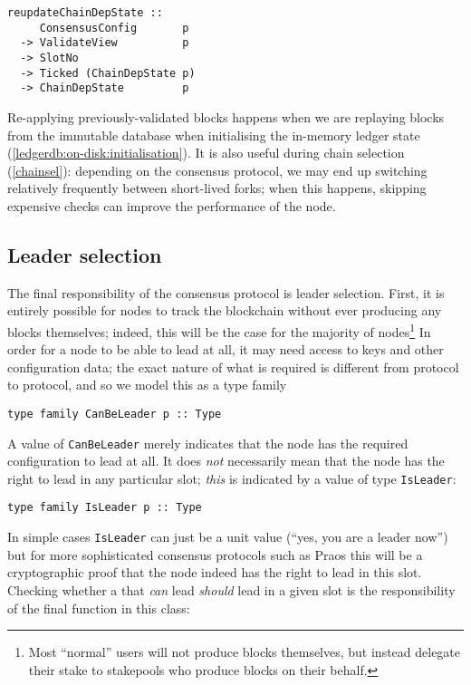 \begin{lstlisting}
reupdateChainDepState ::
     ConsensusConfig       p
  -> ValidateView          p
  -> SlotNo
  -> Ticked (ChainDepState p)
  -> ChainDepState         p
\end{lstlisting}

Re-applying previously-validated blocks happens when we are replaying blocks
from the immutable database when initialising the in-memory ledger state
(\cref{ledgerdb:on-disk:initialisation}). It is also useful during chain
selection (\cref{chainsel}): depending on the consensus protocol, we may end up
switching relatively frequently between short-lived forks; when this happens,
skipping expensive checks can improve the performance of the node. 

\subsection{Leader selection}
\label{consensus:class:leaderselection}

The final responsibility of the consensus protocol is leader selection. First,
it is entirely possible for nodes to track the blockchain without ever producing
any blocks themselves; indeed, this will be the case for the majority of
nodes\footnote{Most ``normal'' users will not produce blocks themselves, but
instead delegate their stake to stakepools who produce blocks on their behalf.}
In order for a node to be able to lead at all, it may need access to keys and
other configuration data; the exact nature of what is required is different
from protocol to protocol, and so we model this as a type family

\begin{lstlisting}
type family CanBeLeader p :: Type
\end{lstlisting}

A value of \lstinline!CanBeLeader! merely indicates that the node has the
required configuration to lead at all. It does \emph{not} necessarily mean that
the node has the right to lead in any particular slot; \emph{this} is indicated
by a value of type \lstinline!IsLeader!:

\begin{lstlisting}
type family IsLeader p :: Type
\end{lstlisting}

In simple cases \lstinline!IsLeader! can just be a unit value (``yes, you are a
leader now'') but for more sophisticated consensus protocols such as Praos this
will be a cryptographic proof that the node indeed has the right to lead in this
slot. Checking whether a that \emph{can} lead \emph{should} lead in a given slot
is the responsibility of the final function in this class:

